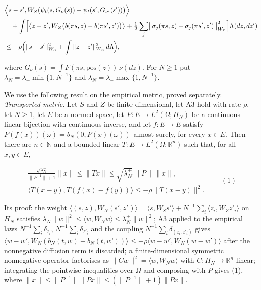 \documentclass[11pt,a4paper]{report}
\begin{document}
\[\begin{aligned}&\Bigl\langle s-s',W_S\bigl(\psi_t(s,G_\nu(s))-\psi_t(s',G_{\nu'}(s'))\bigr)\Bigr\rangle\\ &\quad+\int\Bigl[\bigl\langle z-z',W_Z\bigl(b(\pi s,z)-b(\pi s',z')\bigr)\bigr\rangle+\tfrac12\sum_j\bigl\|\sigma_j(\pi s,z)-\sigma_j(\pi s',z')\bigr\|_{W_Z}^2\Bigr]\Lambda(dz,dz')\\ &\le-\rho\Bigl(\|s-s'\|_{W_S}^2+\int\|z-z'\|_{W_Z}^2\,d\Lambda\Bigr),\end{aligned}\]


where \(G_\nu(s)=\int F(\pi s,\mathrm{pos}(z))\,\nu(dz)\). For \(N\ge1\) put \(\lambda_N^-=\lambda_-\min\{1,N^{-1}\}\) and \(\lambda_N^+=\lambda_+\max\{1,N^{-1}\}\).




We use the following result on the empirical metric, proved separately. \emph{Transported metric.} Let \(S\) and \(Z\) be finite-dimensional, let A3 hold with rate \(\rho\), let \(N\ge1\), let \(E\) be a normed space, let \(P:E\to L^2(\Omega;H_N)\) be a continuous linear bijection with continuous inverse, and let \(f:E\to E\) satisfy \(P(f(x))(\omega)=b_N(0,P(x)(\omega))\) almost surely, for every \(x\in E\). Then there are \(n\in\mathbb N\) and a bounded linear \(T:E\to L^2(\Omega;\mathbb R^n)\) such that, for all \(x,y\in E\),


\[\begin{gathered}\frac{\sqrt{\lambda_N^-}}{\|P^{-1}\|+1}\|x\|\le\|Tx\|\le\sqrt{\lambda_N^+}\,\|P\|\,\|x\|,\\ \bigl\langle T(x-y),T(f(x)-f(y))\bigr\rangle\le-\rho\|T(x-y)\|^2 .\end{gathered}\qquad(1)\]


Its proof: the weight \(\langle(s,z),W_N(s',z')\rangle=\langle s,W_Ss'\rangle+N^{-1}\sum_i\langle z_i,W_Zz'_i\rangle\) on \(H_N\) satisfies \(\lambda_N^-\|w\|^2\le\langle w,W_Nw\rangle\le\lambda_N^+\|w\|^2\); A3 applied to the empirical laws \(N^{-1}\sum_i\delta_{z_i}\), \(N^{-1}\sum_i\delta_{z'_i}\) and the coupling \(N^{-1}\sum_i\delta_{(z_i,z'_i)}\) gives \(\langle w-w',W_N(b_N(t,w)-b_N(t,w'))\rangle\le-\rho\langle w-w',W_N(w-w')\rangle\) after the nonnegative diffusion term is discarded; a finite-dimensional symmetric nonnegative operator factorises as \(\|Cw\|^2=\langle w,W_Nw\rangle\) with \(C:H_N\to\mathbb R^n\) linear; integrating the pointwise inequalities over \(\Omega\) and composing with \(P\) gives (1), where \(\|x\|\le\|P^{-1}\|\|Px\|\le(\|P^{-1}\|+1)\|Px\|\).
\end{document}
